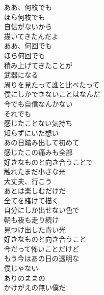 \begin{multicols}{3}
  ああ、何枚でも\\
  ほら何枚でも\\
  自信がないから\\
  描いてきたんだよ\\
  ああ、何回でも\\
  ほら何回でも\\
  積み上げてきたことが\\
  武器になる\\
  周りを見たって誰と比べたって\\
  僕にしかできないことはなんだ\\
  今でも自信なんかない\\
  それでも\\

  感じたことない気持ち\\
  知らずにいた想い\\
  あの日踏み出して初めて\\
  感じたこの痛みも全部\\
  好きなものと向き合うことで\\
  触れたまだ小さな光\\
  大丈夫、行こう\\
  あとは楽しむだけだ\\

  全てを賭けて描く\\
  自分にしか出せない色で\\
  朝も夜も走り続け\\
  見つけ出した青い光\\
  好きなものと向き合うこと\\
  今だって怖いことだけど\\
  もう今はあの日の透明な\\
  僕じゃない\\
  ありのままの\\
  かけがえの無い僕だ\\

  \\
  \\

  \let\fooA\undefined

\end{multicols}
